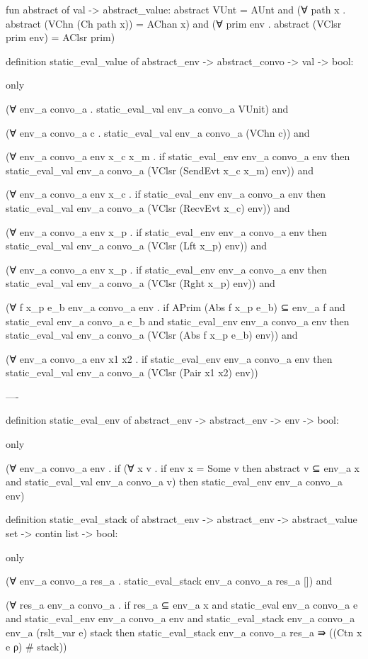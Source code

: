 fun abstract of val -> abstract_value:
  abstract VUnt = AUnt and 
  (∀ path x . 
    abstract (VChn (Ch path x)) = AChan x) and
  (∀ prim env .
    abstract (VClsr prim env) = AClsr prim)

definition static_eval_value of
  abstract_env -> abstract_convo -> val -> bool: 

only

(∀ env_a convo_a . static_eval_val env_a convo_a VUnit) and

(∀ env_a convo_a c . static_eval_val env_a convo_a (VChn c)) and

(∀ env_a convo_a env x_c x_m .
  if
    static_eval_env env_a convo_a env
  then
    static_eval_val env_a convo_a (VClsr (SendEvt x_c x_m) env)) and

(∀ env_a convo_a env x_c  .
  if
    static_eval_env env_a convo_a env
  then
    static_eval_val env_a convo_a (VClsr (RecvEvt x_c) env)) and

(∀ env_a convo_a env x_p  .
  if
    static_eval_env env_a convo_a env
  then
    static_eval_val env_a convo_a (VClsr (Lft x_p) env)) and

(∀ env_a convo_a env x_p  .
  if
    static_eval_env env_a convo_a env
  then
    static_eval_val env_a convo_a (VClsr (Rght x_p) env)) and


(∀ f x_p e_b env_a convo_a env .
  if
    {APrim (Abs f x_p e_b)} ⊆ env_a f and 
    static_eval env_a convo_a e_b and 
    static_eval_env env_a convo_a env
  then
    static_eval_val env_a convo_a (VClsr (Abs f x_p e_b) env)) and

(∀ env_a convo_a env x1 x2 .
  if
    static_eval_env env_a convo_a env
  then
    static_eval_val env_a convo_a (VClsr (Pair x1 x2) env))

----

definition static_eval_env of abstract_env -> abstract_env -> env -> bool:

only 

(∀ env_a convo_a env .
  if
    (∀ x v . if env x = Some v then
      {abstract v} ⊆ env_a x and
      static_eval_val env_a convo_a v)
  then 
    static_eval_env env_a convo_a env)


definition static_eval_stack of
  abstract_env -> abstract_env -> abstract_value set -> contin list -> bool:

only 

(∀ env_a convo_a res_a . static_eval_stack env_a convo_a res_a []) and

(∀ res_a env_a convo_a . 
  if 
    res_a ⊆ env_a x and
    static_eval env_a convo_a e and
    static_eval_env env_a convo_a env and
    static_eval_stack env_a convo_a env_a (rslt_var e) stack 
  then
    static_eval_stack env_a convo_a res_a ⇛ ((Ctn x e ρ) # stack))


